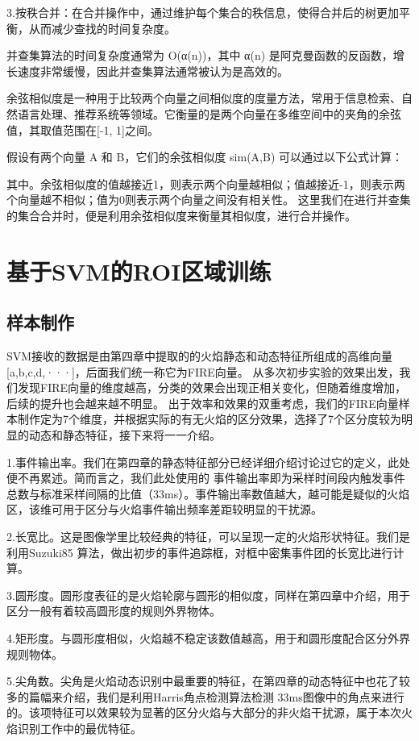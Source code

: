 3.按秩合并：在合并操作中，通过维护每个集合的秩信息，使得合并后的树更加平衡，从而减少查找的时间复杂度。

并查集算法的时间复杂度通常为 O(α(n))，其中 α(n) 是阿克曼函数的反函数，增长速度非常缓慢，因此并查集算法通常被认为是高效的。

余弦相似度是一种用于比较两个向量之间相似度的度量方法，常用于信息检索、自然语言处理、推荐系统等领域。它衡量的是两个向量在多维空间中的夹角的余弦值，其取值范围在[-1, 1]之间。

假设有两个向量 A 和 B，它们的余弦相似度 sim(A,B) 可以通过以下公式计算：

其中。余弦相似度的值越接近1，则表示两个向量越相似；值越接近-1，则表示两个向量越不相似；值为0则表示两个向量之间没有相关性。
这里我们在进行并查集的集合合并时，便是利用余弦相似度来衡量其相似度，进行合并操作。


\section{基于SVM的ROI区域训练}
\subsection{样本制作}
SVM接收的数据是由第四章中提取的的火焰静态和动态特征所组成的高维向量[a,b,c,d,···]，后面我们统一称它为FIRE向量。
从多次初步实验的效果出发，我们发现FIRE向量的维度越高，分类的效果会出现正相关变化，但随着维度增加，后续的提升也会越来越不明显。
出于效率和效果的双重考虑，我们的FIRE向量样本制作定为7个维度，并根据实际的有无火焰的区分效果，选择了7个区分度较为明显的动态和静态特征，接下来将一一介绍。

1.事件输出率。我们在第四章的静态特征部分已经详细介绍讨论过它的定义，此处便不再累述。简而言之，我们此处使用的
事件输出率即为采样时间段内触发事件总数与标准采样间隔的比值（33ms）。事件输出率数值越大，越可能是疑似的火焰区，该维可用于区分与火焰事件输出频率差距较明显的干扰源。

2.长宽比。这是图像学里比较经典的特征，可以呈现一定的火焰形状特征。我们是利用Suzuki85 算法，做出初步的事件追踪框，对框中密集事件团的长宽比进行计算。

3.圆形度。圆形度表征的是火焰轮廓与圆形的相似度，同样在第四章中介绍，用于区分一般有着较高圆形度的规则外界物体。

4.矩形度。与圆形度相似，火焰越不稳定该数值越高，用于和圆形度配合区分外界规则物体。

5.尖角数。尖角是火焰动态识别中最重要的特征，在第四章的动态特征中也花了较多的篇幅来介绍，我们是利用Harris角点检测算法检测
33ms图像中的角点来进行的。该项特征可以效果较为显著的区分火焰与大部分的非火焰干扰源，属于本次火焰识别工作中的最优特征。

